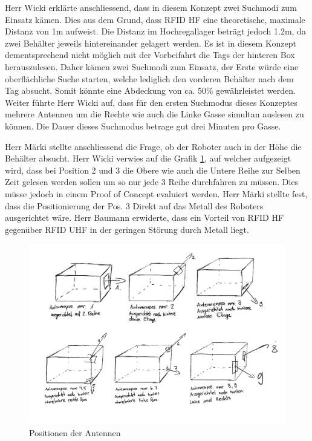 \documentclass[parskip=full, a4paper]{scrreprt}
\begin{document}
Herr Wicki erklärte anschliessend, dass in diesem Konzept zwei Suchmodi zum Einsatz kämen. Dies aus dem Grund, dass RFID HF eine theoretische, maximale Distanz von 1m aufweist. Die Distanz im Hochregallager beträgt jedoch 1.2m, da zwei Behälter jeweils hintereinander gelagert werden. Es ist in diesem Konzept dementsprechend nicht möglich mit der Vorbeifahrt die Tags der hinteren Box herauszulesen. Daher kämen zwei Suchmodi zum Einsatz, der Erste würde eine oberflächliche Suche starten, welche lediglich den vorderen Behälter nach dem Tag absucht. Somit könnte eine Abdeckung von ca. 50\% gewährleistet werden.
Weiter führte Herr Wicki auf, dass für den ersten Suchmodus dieses Konzeptes mehrere Antennen um die Rechte wie auch die Linke Gasse simultan auslesen zu können. Die Dauer dieses Suchmodus betrage gut drei Minuten pro Gasse.

Herr Märki stellte anschliessend die Frage, ob der Roboter auch in der Höhe die Behälter absucht. Herr Wicki verwies auf die Grafik \ref{fig:antennenpos}, auf welcher aufgezeigt wird, dass bei Position 2 und 3 die Obere wie auch die Untere Reihe zur Selben Zeit gelesen werden sollen um so nur jede 3 Reihe durchfahren zu müssen. Dies müsse jedoch in einem Proof of Concept evaluiert werden.
Herr Märki stellte fest, dass die Positionierung der Pos. 3 Direkt auf das Metall des Roboters ausgerichtet wäre. Herr Baumann erwiderte, dass ein Vorteil von RFID HF gegenüber RFID UHF in der geringen Störung durch Metall liegt.

\begin{figure}
	\centering
	\includegraphics[keepaspectratio, width=0.8\linewidth]{images/Konzept_1_Drawings3.pdf}
	\caption{Positionen der Antennen}
	\label{fig:antennenpos}
\end{figure}
\end{document}
